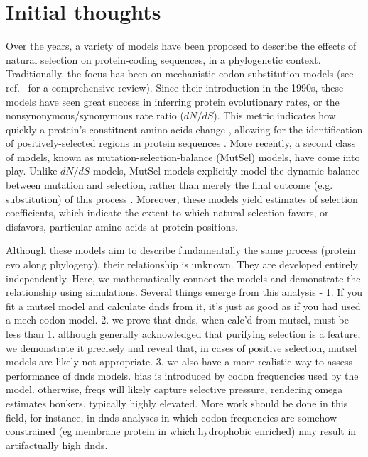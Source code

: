 \documentclass[11pt]{article}
\begin{document}
\section*{Initial thoughts}

Over the years, a variety of models have been proposed to describe the effects of natural selection on protein-coding sequences, in a phylogenetic context. 
Traditionally, the focus has been on mechanistic codon-substitution models (see ref.~\cite{Anisimova2009} for a comprehensive review). Since their introduction in the 1990s, these models have seen great success in inferring protein evolutionary rates, or the nonsynonymous/synonymous rate ratio ($dN/dS$). This metric indicates how quickly a protein's constituent amino acids change \cite{GoldmanYang1994, MuseGaut1994, NielsenYang1998}, allowing for the identification of positively-selected regions in protein sequences \cite{ NielsenYang1998,Yang2000}. 
More recently, a second class of models, known as mutation-selection-balance (MutSel) models, have come into play. Unlike $dN/dS$ models, MutSel models explicitly model the dynamic balance between mutation and selection, rather than merely the final outcome (e.g. substitution) of this process \cite{HalpernBruno1998, Yang2008, Rodrigue2010, Tamuri2012}. Moreover, these models yield estimates of selection coefficients, which indicate the extent to which natural selection favors, or disfavors, particular amino acids at protein positions.

Although these models aim to describe fundamentally the same process (protein evo along phylogeny), their relationship is unknown. They are developed entirely independently.
Here, we mathematically connect the models and demonstrate the relationship using simulations. Several things emerge from this analysis - 
1. If you fit a mutsel model and calculate dnds from it, it's just as good as if you had used a mech codon model. 
2. we prove that dnds, when calc'd from mutsel, must be less than 1. although generally acknowledged that purifying selection is a feature, we demonstrate it precisely and reveal that, in cases of positive selection, mutsel models are likely not appropriate.
3. we also have a more realistic way to assess performance of dnds models. bias is introduced by codon frequencies used by the model. otherwise, freqs will likely capture selective pressure, rendering omega estimates bonkers. typically highly elevated. More work should be done in this field, for instance, in dnds analyses in which codon frequencies are somehow constrained (eg membrane protein in which hydrophobic enriched) may result in artifactually high dnds.
\end{document}
